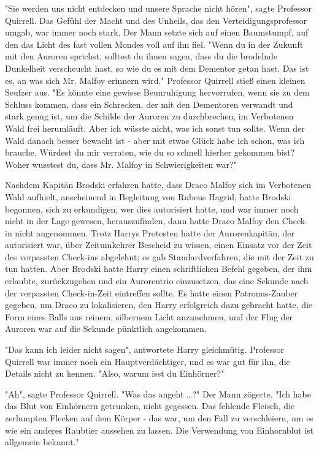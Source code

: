 {"Sie werden uns nicht entdecken und unsere Sprache nicht hören", sagte Professor Quirrell. Das Gefühl der Macht und des Unheils, das den Verteidigungsprofessor umgab, war immer noch stark. Der Mann setzte sich auf einen Baumstumpf, auf den das Licht des fast vollen Mondes voll auf ihn fiel. "Wenn du in der Zukunft mit den Auroren sprichst, solltest du ihnen sagen, dass du die brodelnde Dunkelheit verscheucht hast, so wie du es mit dem Dementor getan hast. Das ist es, an was sich Mr. Malfoy erinnern wird." Professor Quirrell stieß einen kleinen Seufzer aus. "Es könnte eine gewisse Beunruhigung hervorrufen, wenn sie zu dem Schluss kommen, dass ein Schrecken, der mit den Dementoren verwandt und stark genug ist, um die Schilde der Auroren zu durchbrechen, im Verbotenen Wald frei herumläuft. Aber ich wüsste nicht, was ich sonst tun sollte. Wenn der Wald danach besser bewacht ist - aber mit etwas Glück habe ich schon, was ich brauche. Würdest du mir verraten, wie du so schnell hierher gekommen bist? Woher wusstest du, dass Mr. Malfoy in Schwierigkeiten war?"

Nachdem Kapitän Brodski erfahren hatte, dass Draco Malfoy sich im Verbotenen Wald aufhielt, anscheinend in Begleitung von Rubeus Hagrid, hatte Brodski begonnen, sich zu erkundigen, wer dies autorisiert hatte, und war immer noch nicht in der Lage gewesen, herauszufinden, dann hatte Draco Malfoy den Check-in nicht angenommen. Trotz Harrys Protesten hatte der Aurorenkapitän, der autorisiert war, über Zeitumkehrer Bescheid zu wissen, einen Einsatz vor der Zeit des verpassten Check-ins abgelehnt; es gab Standardverfahren, die mit der Zeit zu tun hatten. Aber Brodski hatte Harry einen schriftlichen Befehl gegeben, der ihm erlaubte, zurückzugehen und ein Aurorentrio einzusetzen, das eine Sekunde nach der verpassten Check-in-Zeit eintreffen sollte. Es hatte einen Patronus-Zauber gegeben, um Draco zu lokalisieren, den Harry erfolgreich dazu gebracht hatte, die Form eines Balls aus reinem, silbernem Licht anzunehmen, und der Flug der Auroren war auf die Sekunde pünktlich angekommen.

"Das kann ich leider nicht sagen", antwortete Harry gleichmütig. Professor Quirrell war immer noch ein Hauptverdächtiger, und es war gut für ihn, die Details nicht zu kennen. "Also, warum isst du Einhörner?"

"Ah", sagte Professor Quirrell. "Was das angeht …?" Der Mann zögerte. "Ich habe das Blut von Einhörnern getrunken, nicht gegessen. Das fehlende Fleisch, die zerlumpten Flecken auf dem Körper - das war, um den Fall zu verschleiern, um es wie ein anderes Raubtier aussehen zu lassen. Die Verwendung von Einhornblut ist allgemein bekannt."

}
